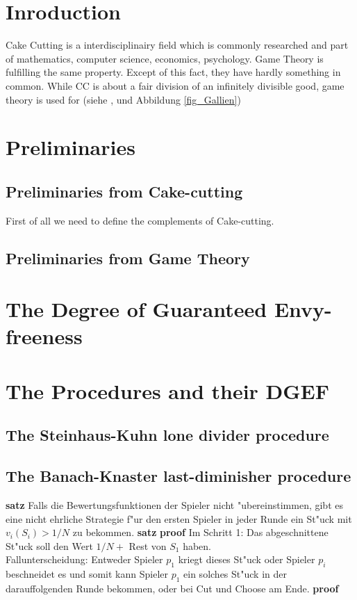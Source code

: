 


\section{Inroduction}
Cake Cutting is a interdisciplinairy field which is commonly researched and part of mathematics, computer science, economics, psychology. Game Theory is fulfilling the same property. Except of this fact, they have hardly something in common. While CC is about a fair division of an infinitely divisible good, game theory is used for 
(siehe \cite{Con97},
\cite{PeHe97} und Abbildung \ref{fig_Gallien})
\section{Preliminaries}
\subsection{Preliminaries from Cake-cutting}
First of all we need to define the complements of Cake-cutting. 
\subsection{Preliminaries from Game Theory}
\section{The Degree of Guaranteed Envy-freeness}
\section{The Procedures and their DGEF}
\subsection{The Steinhaus-Kuhn lone divider procedure}
\subsection{The Banach-Knaster last-diminisher procedure}
\textbf{satz}
Falls die Bewertungsfunktionen der Spieler nicht "ubereinstimmen, gibt es eine nicht ehrliche Strategie f"ur den ersten Spieler in jeder Runde ein St"uck mit $v_i(S_i)>1/N$ zu bekommen.
\textbf{satz}
\textbf{proof}
Im Schritt 1: Das abgeschnittene St"uck soll den Wert $1/N+$ Rest von $S_1$ haben.\\
Fallunterscheidung: Entweder Spieler $p_1$ kriegt dieses St"uck oder Spieler $p_i$ beschneidet es und somit kann Spieler $p_1$ ein solches St"uck in der darauffolgenden Runde bekommen, oder bei Cut und Choose am Ende.
\textbf{proof}
